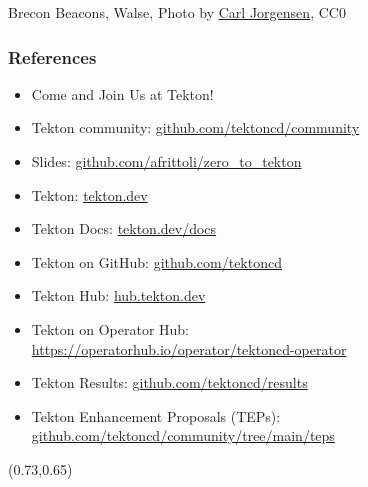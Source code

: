 \documentclass[aspectratio=169,11pt,hyperref={colorlinks=true}]{beamer}
\begin{document}
\begin{sectionwithpiclargecentral}{Brecon Beacons, Walse, Photo by \href{https://unsplash.com/@scamartist}{\underline{Carl Jorgensen}}, CC0}
\end{sectionwithpiclargecentral}

\begin{blackframe}
  \frametitle{References}
  \begin{itemize}
    \item \large Come and Join Us at Tekton!
    \item \normalsize Tekton community: \href{https://github.com/tektoncd/community}{github.com/tektoncd/community} \\
  \end{itemize}
  \begin{itemize}
    \item Slides: \href{https://github.com/afrittoli/zero_to_tekton/blob/cnd2021/zero_to_tekton.pdf}{github.com/afrittoli/zero\_to\_tekton}
    \item Tekton: \href{https://tekton.dev}{tekton.dev}
    \item Tekton Docs: \href{https://tekton.dev/docs}{tekton.dev/docs}
    \item Tekton on GitHub: \href{https://github.com/tektoncd}{github.com/tektoncd}
    \item Tekton Hub: \href{https://hub.tekton.dev}{hub.tekton.dev}
    \item Tekton on Operator Hub:\\\href{https://https://operatorhub.io/operator/tektoncd-operator}{https://operatorhub.io/operator/tektoncd-operator}
    \item Tekton Results: \href{https://github.com/tektoncd/results}{github.com/tektoncd/results}
    \item Tekton Enhancement Proposals (TEPs): \href{https://github.com/tektoncd/community/tree/main/teps\#tekton-enhancement-proposals-teps}{github.com/tektoncd/community/tree/main/teps}
  \end{itemize}
  \begin{textblock*}{0.13\paperwidth}(0.73\paperwidth,0.65\paperheight)
    
  \end{textblock*}
\end{blackframe}
\end{document}

